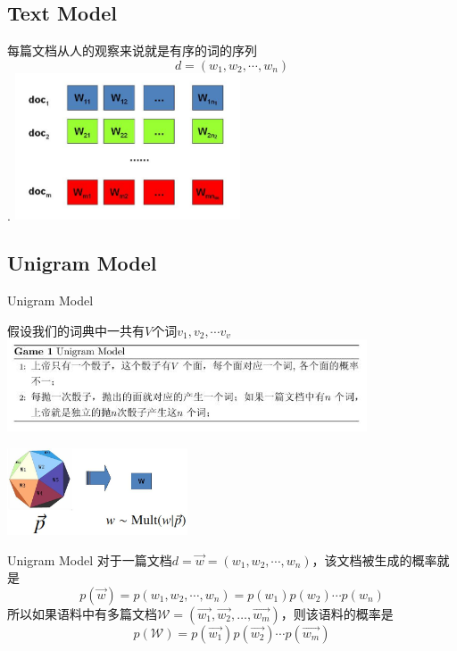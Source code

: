 \documentclass{beamer}
\begin{document}
\begin{CJK*}{UTF8}{gbsn}
\section{Text Model}
\begin{frame}

\begin{center}
	每篇文档从人的观察来说就是有序的词的序列$$d=(w_1, w_2, \cdots, w_n)$$.
      \includegraphics[width=0.5\textwidth]{picture/docp.png}
\end{center} 
\end{frame}

\subsection{Unigram Model}
\begin{frame}{Unigram Model}
\begin{center}
假设我们的词典中一共有$V$个词$v_1, v_2, \cdots v_v$
 \includegraphics[width=0.8\textwidth]{picture/gm1.jpeg}
\end{center}
\begin{center}
\includegraphics[width=0.4\textwidth]{picture/u.jpeg}
\end{center}
\end{frame}

\begin{frame}{Unigram Model}
对于一篇文档$d=\overrightarrow{w}=(w_1, w_2, \cdots, w_n)$，该文档被生成的概率就是$$ p(\overrightarrow{w}) = p(w_1, w_2, \cdots, w_n) = p(w_1)p(w_2) \cdots p(w_n) $$所以如果语料中有多篇文档$\mathcal{W}=(\overrightarrow{w_1}, \overrightarrow{w_2},…,\overrightarrow{w_m})$，则该语料的概率是$$p(\mathcal{W})= p(\overrightarrow{w_1})p(\overrightarrow{w_2})\cdots p(\overrightarrow{w_m}) $$
\end{frame}


\end{CJK*}
\end{document}
